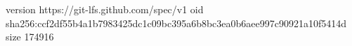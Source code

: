 version https://git-lfs.github.com/spec/v1
oid sha256:ccf2df55b4a1b7983425dc1c09bc395a6b8bc3ea0b6aee997c90921a10f5414d
size 174916
